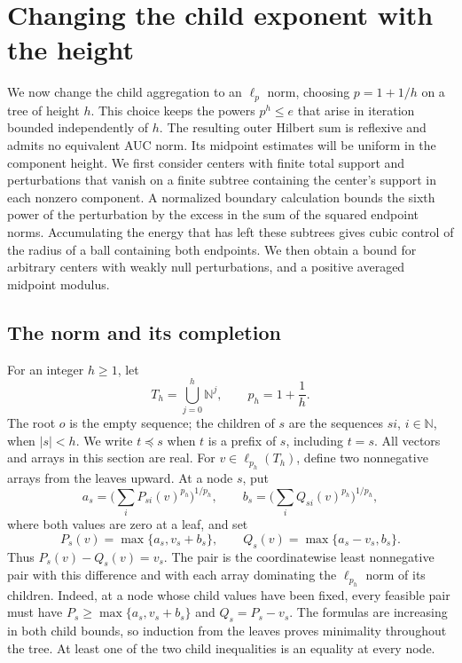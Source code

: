 \section{Changing the child exponent with the height}
\label{sec:variable}
\label{var:section}

We now change the child aggregation to an $\ell_p$ norm, choosing
$p=1+1/h$ on a tree of height $h$.  This choice keeps the powers
$p^h\le e$ that arise in iteration bounded independently of $h$.
The resulting outer Hilbert sum is reflexive and admits no equivalent
AUC norm. Its midpoint estimates will be uniform in the component
height. We first consider centers with finite total support and
perturbations that vanish on a finite subtree containing the center's support in
each nonzero component. A normalized boundary calculation bounds the
sixth power of the perturbation by the excess in the sum of the squared
endpoint norms. Accumulating the energy that has left these subtrees
gives cubic control of the radius of a ball containing both endpoints.
We then obtain a bound for arbitrary centers with weakly null
perturbations, and a positive averaged midpoint modulus.

\subsection{The norm and its completion}

For an integer $h\ge1$, let
\[
 T_h=\bigcup_{j=0}^{h}\mathbb N^j,\qquad p_h=1+\frac1h.
\]
The root $o$ is the empty sequence; the children of $s$ are the
sequences $si$, $i\in\mathbb N$, when $|s|<h$.  We write $t\preceq s$
when $t$ is a prefix of $s$, including $t=s$.  All vectors and arrays
in this section are real.  For $v\in\ell_{p_h}(T_h)$, define two
nonnegative arrays from the leaves upward.  At a node $s$, put
\[
 a_s=\biggl(\sum_i P_{si}(v)^{p_h}\biggr)^{1/p_h},\qquad
 b_s=\biggl(\sum_i Q_{si}(v)^{p_h}\biggr)^{1/p_h},
\]
where both values are zero at a leaf, and set
\begin{equation}\label{var:recursion}
 P_s(v)=\max\{a_s,v_s+b_s\},\qquad
 Q_s(v)=\max\{a_s-v_s,b_s\}.
\end{equation}
Thus $P_s(v)-Q_s(v)=v_s$.  The pair is the coordinatewise least
nonnegative pair with this difference and with each array dominating
the $\ell_{p_h}$ norm of its children.  Indeed, at a node whose child
values have been fixed, every feasible pair must have
$P_s\ge\max\{a_s,v_s+b_s\}$ and $Q_s=P_s-v_s$.
The formulas are increasing in both child bounds, so induction from
the leaves proves minimality throughout the tree.  At least one of
the two child inequalities is an equality at every node.

